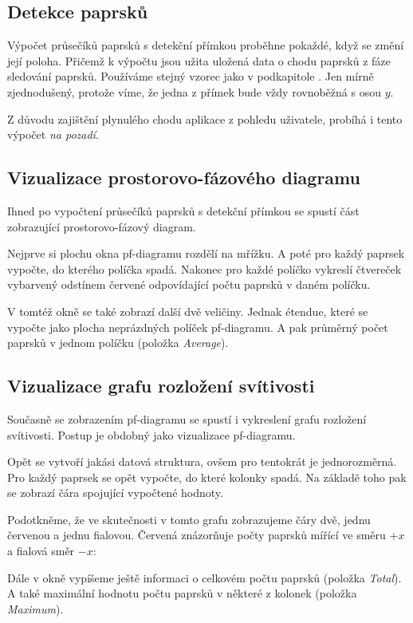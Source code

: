 \subsection{Detekce paprsků}

Výpočet průsečíků paprsků s detekční přímkou proběhne pokaždé, když se změní její poloha. Přičemž k výpočtu jsou užita uložená data o chodu paprsků z fáze sledování paprsků. Používáme stejný vzorec jako v podkapitole . Jen mírně zjednodušený, protože víme, že jedna z přímek bude vždy rovnoběžná s osou $y$.

Z důvodu zajištění plynulého chodu aplikace z pohledu uživatele, probíhá i tento výpočet \emph{na pozadí}.


\subsection{Vizualizace prostorovo-fázového diagramu}

Ihned po vypočtení průsečíků paprsků s detekční přímkou se spustí část zobrazující prostorovo-fázový diagram.

Nejprve si plochu okna pf-diagramu rozdělí na mřížku. A poté pro každý paprsek vypočte, do kterého políčka spadá. Nakonec pro každé políčko vykreslí čtvereček vybarvený odstínem červené odpovídající počtu paprsků v daném políčku.

V tomtéž okně se také zobrazí další dvě veličiny. Jednak étendue, které se vypočte jako plocha neprázdných políček pf-diagramu. A pak průměrný počet paprsků v jednom políčku (položka \emph{Average}).


\subsection{Vizualizace grafu rozložení svítivosti}

Současně se zobrazením pf-diagramu se spustí i vykreslení grafu rozložení svítivosti. Postup je obdobný jako vizualizace pf-diagramu.

Opět se vytvoří jakási datová struktura, ovšem pro tentokrát je jednorozměrná. Pro každý paprsek se opět vypočte, do které kolonky spadá. Na základě toho pak se zobrazí čára spojující vypočtené hodnoty.

Podotkněme, že ve skutečnosti v tomto grafu zobrazujeme čáry dvě, jednu červenou a jednu fialovou. Červená znázorňuje počty paprsků mířící ve směru $+x$ a fialová směr $-x$:

Dále v okně vypíšeme ještě informaci o celkovém počtu paprsků (položka \emph{Total}). A také maximální hodnotu počtu paprsků v některé z kolonek (položka \emph{Maximum}).

